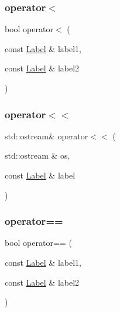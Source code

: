 \mbox{\label{classlabelling_1_1Label_aac0781be66b1d133b633cef3f60f8183}} 
\subsubsection{\texorpdfstring{operator$<$}{operator<}}
{\footnotesize\ttfamily bool operator$<$ (\begin{DoxyParamCaption}\item[{const \hyperlink{classlabelling_1_1Label}{Label} \&}]{label1,  }\item[{const \hyperlink{classlabelling_1_1Label}{Label} \&}]{label2 }\end{DoxyParamCaption})\hspace{0.3cm}{\ttfamily [friend]}}

\mbox{\label{classlabelling_1_1Label_ae52256a096ed1acaf1afaba6458b42ca}} 
\subsubsection{\texorpdfstring{operator$<$$<$}{operator<<}}
{\footnotesize\ttfamily std\+::ostream\& operator$<$$<$ (\begin{DoxyParamCaption}\item[{std\+::ostream \&}]{os,  }\item[{const \hyperlink{classlabelling_1_1Label}{Label} \&}]{label }\end{DoxyParamCaption})\hspace{0.3cm}{\ttfamily [friend]}}

\mbox{\label{classlabelling_1_1Label_abc60b45b5a5310043283c0e6c694cc92}} 
\subsubsection{\texorpdfstring{operator==}{operator==}}
{\footnotesize\ttfamily bool operator== (\begin{DoxyParamCaption}\item[{const \hyperlink{classlabelling_1_1Label}{Label} \&}]{label1,  }\item[{const \hyperlink{classlabelling_1_1Label}{Label} \&}]{label2 }\end{DoxyParamCaption})\hspace{0.3cm}{\ttfamily [friend]}}

